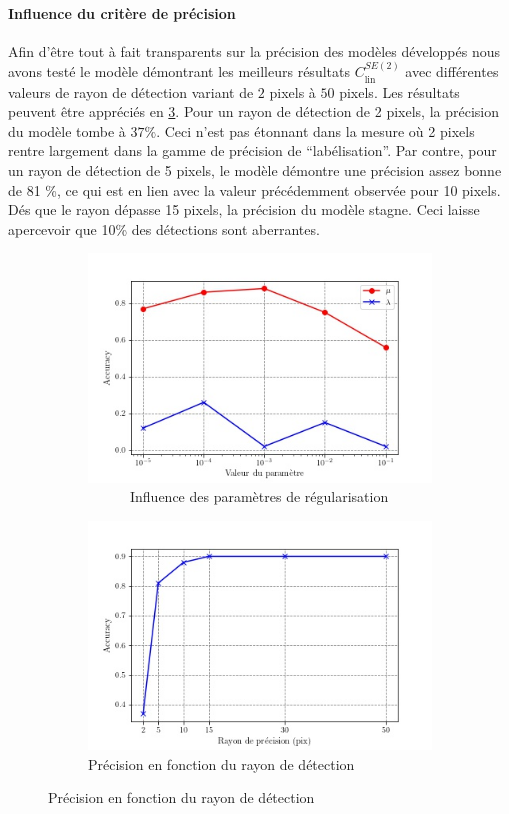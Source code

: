 \documentclass{article}
\begin{document}
\paragraph{Influence du critère de précision}
Afin d'être tout à fait transparents sur la précision des modèles développés nous avons testé le modèle démontrant les meilleurs 
résultats $C_{\text{lin}}^{SE(2)}$ avec différentes valeurs de rayon de détection variant de $2$ pixels à $50$ pixels. Les résultats 
peuvent être appréciés en \ref{fig:radius}. Pour un rayon de détection de 2 pixels, la précision du modèle tombe à $37 \%$. Ceci n'est pas 
étonnant dans la mesure où 2 pixels rentre largement dans la gamme de précision de ``labélisation''. Par contre, pour un rayon de détection de 5 pixels, 
le modèle démontre une précision assez bonne de 81 \%, ce qui est en lien avec la valeur précédemment observée pour 10 pixels. Dés que le rayon dépasse 
15 pixels, la précision du modèle stagne. Ceci laisse apercevoir que 10\% des détections sont aberrantes.

\begin{figure}[t]
\centering
\hspace*{-5em}%
\begin{subfigure}{.6\textwidth}
\includegraphics[scale=0.65]{plots/parameter_score_C_D_lin_R2.jpg}%
  \caption{$ \quad \quad \quad $Influence des paramètres de régularisation}%
    \label{fig:param}
\end{subfigure}%
\begin{subfigure}{.6\textwidth}
  \includegraphics[scale=0.65]{plots/radius_scores.jpg}
  \caption{ Précision en fonction du rayon de détection}%
  \label{fig:radius}
\end{subfigure}
\end{figure}
\end{document}
